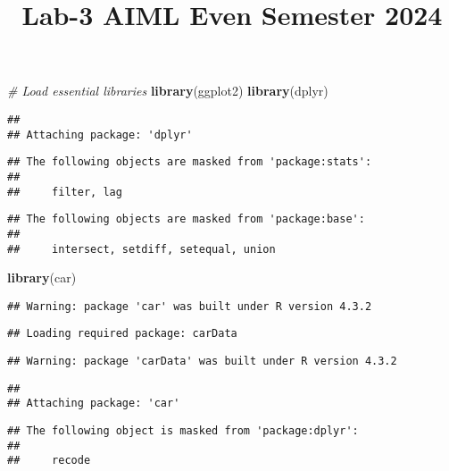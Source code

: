 \documentclass[
]{article}
\title{Lab-3 AIML Even Semester 2024}
\author{}
\date{\vspace{-2.5em}}
\newenvironment{Shaded}{\begin{snugshade}}{\end{snugshade}}
\newcommand{\CommentTok}[1]{\textcolor[rgb]{0.56,0.35,0.01}{\textit{#1}}}
\newcommand{\FunctionTok}[1]{\textcolor[rgb]{0.13,0.29,0.53}{\textbf{#1}}}
\newcommand{\NormalTok}[1]{#1}
\begin{document}
\maketitle

\begin{Shaded}
\begin{Highlighting}[]
\CommentTok{\# Load essential libraries}
\FunctionTok{library}\NormalTok{(ggplot2)}
\FunctionTok{library}\NormalTok{(dplyr)}
\end{Highlighting}
\end{Shaded}

\begin{verbatim}
## 
## Attaching package: 'dplyr'
\end{verbatim}

\begin{verbatim}
## The following objects are masked from 'package:stats':
## 
##     filter, lag
\end{verbatim}

\begin{verbatim}
## The following objects are masked from 'package:base':
## 
##     intersect, setdiff, setequal, union
\end{verbatim}

\begin{Shaded}
\begin{Highlighting}[]
\FunctionTok{library}\NormalTok{(car)}
\end{Highlighting}
\end{Shaded}

\begin{verbatim}
## Warning: package 'car' was built under R version 4.3.2
\end{verbatim}

\begin{verbatim}
## Loading required package: carData
\end{verbatim}

\begin{verbatim}
## Warning: package 'carData' was built under R version 4.3.2
\end{verbatim}

\begin{verbatim}
## 
## Attaching package: 'car'
\end{verbatim}

\begin{verbatim}
## The following object is masked from 'package:dplyr':
## 
##     recode
\end{verbatim}
\end{document}
